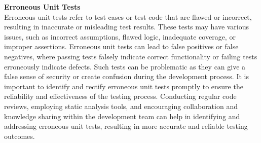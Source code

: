 \noindent \textbf{Erroneous Unit Tests} \\

Erroneous unit tests refer to test cases or test code that are flawed or incorrect, resulting in inaccurate or misleading test results. These tests may have various issues, such as incorrect assumptions, flawed logic, inadequate coverage, or improper assertions. Erroneous 
unit tests can lead to false positives or false negatives, where passing tests falsely indicate correct functionality or failing tests erroneously indicate defects. Such tests can be problematic as they can give a false sense of security or create confusion during the development 
process. It is important to identify and rectify erroneous unit tests promptly to ensure the reliability and effectiveness of the testing process. Conducting regular code reviews, employing static analysis tools, and encouraging collaboration and knowledge sharing within the 
development team can help in identifying and addressing erroneous unit tests, resulting in more accurate and reliable testing outcomes. \\

